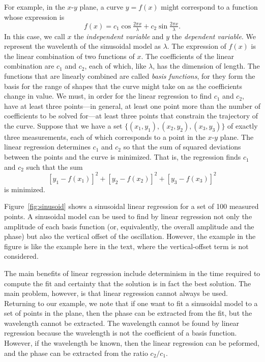 \documentclass[twocolumn]{article}
\begin{document}
For example, in the $x$-$y$ plane, a curve $y = f(x)$ might correspond to a
function whose expression is
\begin{equation}
   f(x) = c_1 \cos\tfrac{2\pi x}{\lambda} + c_2 \sin\tfrac{2\pi x}{\lambda}.
\end{equation}
In this case, we call $x$ the \emph{independent variable} and $y$ the
\emph{dependent variable}.  We represent the wavelenth of the sinusoidal model
as $\lambda$.  The expression of $f(x)$ is the linear combination of two
functions of $x$. The coefficients of the linear combination are $c_1$ and
$c_2$, each of which, like $\lambda$, has the dimension of length. The
functions that are linearly combined are called \emph{basis functions}, for
they form the basis for the range of shapes that the curve might take on as the
coefficients change in value.  We must, in order for the linear regression to
find $c_1$ and $c_2$, have at least three points---in general, at least one
point more than the number of coefficients to be solved for---at least three
points that constrain the trajectory of the curve.  Suppose that we have a set
$\{(x_1, y_1), (x_2, y_2), (x_3, y_3)\}$ of exactly three measurements, each of
which corresponds to a point in the $x$-$y$ plane.  The linear regression
determines $c_1$ and $c_2$ so that the sum of squared deviations between the
points and the curve is minimized.  That is, the regression finds $c_1$ and
$c_2$ such that the sum
\begin{equation}
   \left[y_1 - f(x_1)\right]^2 + \left[y_2 - f(x_2)\right]^2 + \left[y_3 -
   f(x_3)\right]^2
\end{equation}
is minimized.

Figure~\ref{fig:sinusoid} shows a sinusoidal linear regression for a set of 100
measured points. A sinusoidal model can be used to find by linear regression
not only the amplitude of each basis function (or, equivalently, the overall
amplitude and the phase) but also the vertical offset of the oscillation.
However, the example in the figure is like the example here in the text, where
the vertical-offset term is not considered.

The main benefits of linear regression include determinism in the time required
to compute the fit and certainty that the solution is in fact the best
solution. The main problem, however, is that linear regression cannot always be
used.  Returning to our example, we note that if one want to fit a sinusoidal
model to a set of points in the plane, then the phase can be extracted from the
fit, but the wavelength cannot be extracted. The wavelength cannot be found by
linear regression because the wavelength is not the coefficient of a basis
function.  However, if the wavelength be known, then the linear regression can
be peformed, and the phase can be extracted from the ratio $c_2/c_1$.
\end{document}
